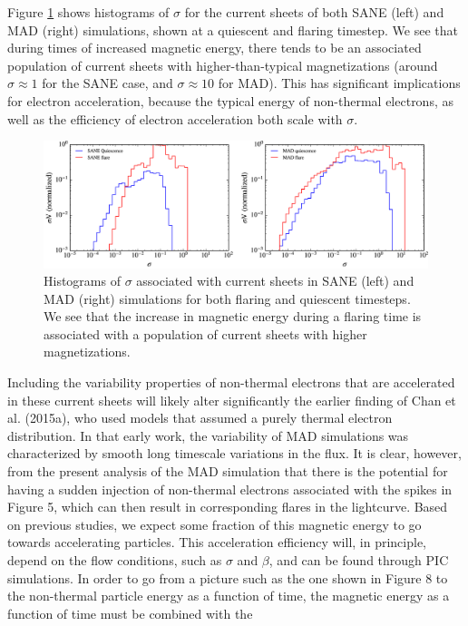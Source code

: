 Figure \ref{sig_flare_hist} shows histograms of $\sigma$ for the current sheets of both SANE (left) and MAD (right) simulations, shown at a quiescent and flaring timestep. We see that during times of
increased magnetic energy, there tends to be an associated
population of current sheets with higher-than-typical magnetizations (around $\sigma \approx 1$ for the SANE case, and $\sigma \approx 10$ for MAD). This has significant implications for electron acceleration, because the typical energy of non-thermal electrons, as
well as the efficiency of electron acceleration both scale with $\sigma$.
\begin{figure}[!h]
	\centering
	\includegraphics[width =\textwidth]{paper2_fig10.jpg}
	\caption{Histograms of $\sigma$ associated with current sheets in SANE (left) and MAD (right) simulations for both flaring and quiescent timesteps. We see that the increase in magnetic energy during a flaring time is associated with a population of current sheets with higher magnetizations.}
	\label{sig_flare_hist}
\end{figure}
Including the variability properties of non-thermal
electrons that are accelerated in these current sheets will
likely alter significantly the earlier finding of Chan et al.
(2015a), who used models that assumed a purely thermal electron distribution. In that early work, the variability of MAD simulations was characterized by smooth
long timescale variations in the flux. It is clear, however,
from the present analysis of the MAD simulation that
there is the potential for having a sudden injection of
non-thermal electrons associated with the spikes in Figure 5, which can then result in corresponding flares in
the lightcurve.
Based on previous studies, we expect some fraction of
this magnetic energy to go towards accelerating particles.
This acceleration efficiency will, in principle, depend on
the flow conditions, such as $\sigma$ and $\beta$, and can be found
through PIC simulations. In order to go from a picture
such as the one shown in Figure 8 to the non-thermal
particle energy as a function of time, the magnetic energy as a function of time must be combined with the
